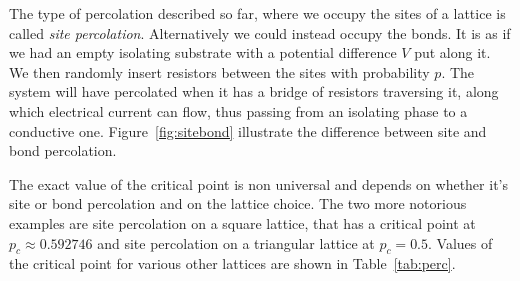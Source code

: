 The type of percolation described so far, where we occupy the sites of a lattice
is called \textit{site percolation}. Alternatively we could instead occupy the
bonds. It is as if we had an empty isolating substrate with a potential
difference $V$ put along it. We then randomly insert resistors between the
sites with probability $p$. The system will have percolated when it has a
bridge of resistors traversing it, along which electrical current can flow,
thus passing from an isolating phase to a conductive one.
Figure~\ref{fig:sitebond} illustrate the difference between site and bond
percolation.

The exact value of the critical point is non universal and depends on whether
it's site or bond percolation and on the lattice choice. The two more notorious
examples are site percolation on a square lattice, that has a critical point at
$p_c\approx0.592746$ and site percolation on a triangular lattice at $p_c=0.5$.
Values of the critical point for various other lattices are shown in
Table~\ref{tab:perc}.

